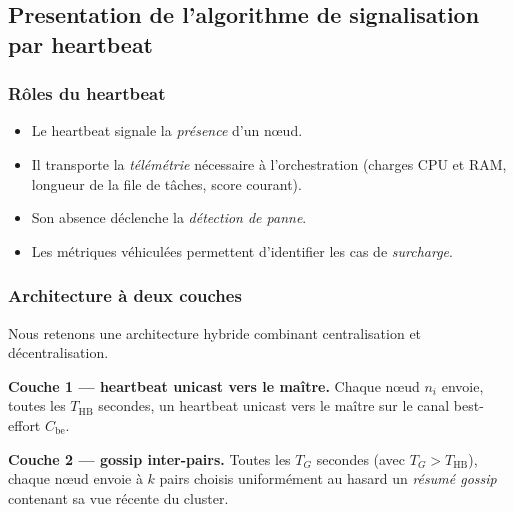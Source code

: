 \documentclass[12pt,a4paper]{report}
\theoremstyle{definition}
\begin{document}
\subsection{Presentation de l'algorithme de signalisation par heartbeat}

\subsubsection{Rôles du heartbeat}
\begin{itemize}
    \item[$\bullet$] Le heartbeat signale la \emph{présence} d’un nœud.
    
    \item[$\bullet$] Il transporte la \emph{télémétrie} nécessaire à l’orchestration (charges CPU et RAM, longueur de la file de tâches, score courant).
    
    \item[$\bullet$] Son absence déclenche la \emph{détection de panne}.
    
    \item[$\bullet$] Les métriques véhiculées permettent d’identifier les cas de \emph{surcharge}.
\end{itemize}

\subsubsection{Architecture à deux couches}

Nous retenons une architecture hybride combinant centralisation et décentralisation.

\textbf{Couche 1 --- heartbeat unicast vers le maître.} Chaque nœud $n_i$ envoie, toutes les $T_{\mathrm{HB}}$ secondes, un heartbeat unicast vers le maître sur le canal best-effort $C_{\mathrm{be}}$.

\textbf{Couche 2 --- gossip inter-pairs.} Toutes les $T_G$ secondes (avec $T_G > T_{\mathrm{HB}}$), chaque nœud envoie à $k$ pairs choisis uniformément au hasard un \emph{résumé gossip} contenant sa vue récente du cluster.
\end{document}
